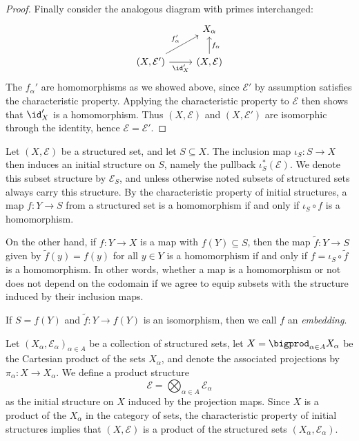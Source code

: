 \documentclass[article, a4paper, 11pt, oneside]{memoir}
\numberwithin{equation}{chapter}
\newcommand{\calE}{\mathcal{E}}
\begin{document}
\begin{proof}
    Finally consider the analogous diagram with primes interchanged:
    \begin{equation*}
        \begin{tikzcd}
            & X_\alpha \\
            (X, \calE')
                \ar[r, "\id_X'", swap]
                \ar[ur, "f_\alpha'"]
            & (X, \calE)
                \ar[u, "f_\alpha", swap]
        \end{tikzcd}
    \end{equation*}
    The $f_\alpha'$ are homomorphisms as we showed above, since $\calE'$ by assumption satisfies the characteristic property. Applying the characteristic property to $\calE$ then shows that $\id_X'$ is a homomorphism. Thus $(X,\calE)$ and $(X,\calE')$ are isomorphic through the identity, hence $\calE = \calE'$.
\end{proof}

\begin{examplebreak}[Subsets]
    \label{ex:subset_structure}
    Let $(X,\calE)$ be a structured set, and let $S \subseteq X$. The inclusion map $\iota_S \colon S \to X$ then induces an initial structure on $S$, namely the pullback $\iota_S^*(\calE)$. We denote this subset structure by $\calE_S$, and unless otherwise noted subsets of structured sets always carry this structure. By the characteristic property of initial structures, a map $f \colon Y \to S$ from a structured set is a homomorphism if and only if $\iota_S \circ f$ is a homomorphism.

    On the other hand, if $f \colon Y \to X$ is a map with $f(Y) \subseteq S$, then the map $\tilde f \colon Y \to S$ given by $\tilde f(y) = f(y)$ for all $y \in Y$ is a homomorphism if and only if $f = \iota_S \circ \tilde f$ is a homomorphism. In other words, whether a map is a homomorphism or not does not depend on the codomain if we agree to equip subsets with the structure induced by their inclusion maps.

    If $S = f(Y)$ and $\tilde f \colon Y \to f(Y)$ is an isomorphism, then we call $f$ an \emph{embedding}.
\end{examplebreak}

\begin{examplebreak}[Products]
    \label{ex:product_structure}
    Let $(X_\alpha, \calE_\alpha)_{\alpha \in A}$ be a collection of structured sets, let $X = \bigprod_{\alpha \in A} X_\alpha$ be the Cartesian product of the sets $X_\alpha$, and denote the associated projections by $\pi_\alpha \colon X \to X_\alpha$. We define a product structure
    \begin{equation*}
        \calE = \bigotimes_{\alpha \in A} \calE_\alpha
    \end{equation*}
    as the initial structure on $X$ induced by the projection maps. Since $X$ is a product of the $X_\alpha$ in the category of sets, the characteristic property of initial structures implies that $(X,\calE)$ is a product of the structured sets $(X_\alpha,\calE_\alpha)$.
\end{examplebreak}
\end{document}
